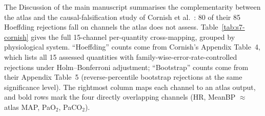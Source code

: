 \documentclass[pdflatex,sn-nature]{sn-jnl}%
\begin{document}
The Discussion of the main manuscript summarises the complementarity between the atlas and the causal-falsification study of Cornish et al.~\cite{cornish2023}: 80 of their 85 Hoeffding rejections fall on channels the atlas does not assess. Table~\ref{tab:s7-cornish} gives the full 15-channel per-quantity cross-mapping, grouped by physiological system. ``Hoeffding'' counts come from Cornish's Appendix Table~4, which lists all 15 assessed quantities with family-wise-error-rate-controlled rejections under Holm--Bonferroni adjustment; ``Bootstrap'' counts come from their Appendix Table~5 (reverse-percentile bootstrap rejections at the same significance level). The rightmost column maps each channel to an atlas output, and bold rows mark the four directly overlapping channels (HR, MeanBP $\approx$ atlas MAP, PaO$_2$, PaCO$_2$).
\end{document}
